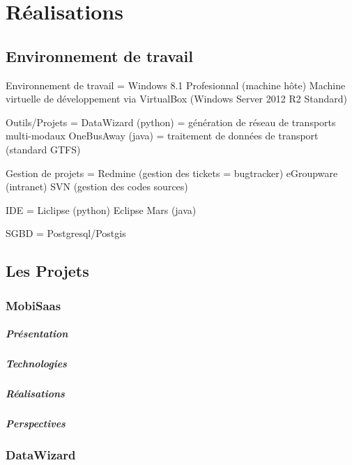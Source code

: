 \chapter{Réalisations}
\label{AnalyseConception}

\section{Environnement de travail}
Environnement de travail =
Windows 8.1 Profesionnal (machine hôte)
Machine virtuelle de développement via VirtualBox (Windows Server 2012 R2 Standard)

Outils/Projets =
DataWizard (python) = génération de réseau de transports multi-modaux
OneBusAway (java) = traitement de données de transport (standard GTFS)

Gestion de projets =
Redmine (gestion des tickets = bugtracker)
eGroupware (intranet)
SVN (gestion des codes sources)

IDE =
    Liclipse (python)
    Eclipse Mars (java)

SGBD = 
Postgresql/Postgis

\section{Les Projets}

\subsection{MobiSaas}

\paragraph{Présentation}

\paragraph{Technologies}

\paragraph{Réalisations}

\paragraph{Perspectives}

\subsection{DataWizard}

